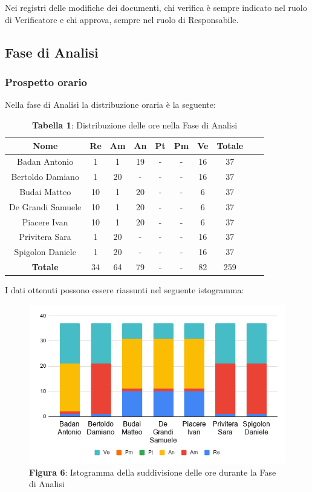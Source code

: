 Nei registri delle modifiche dei documenti, chi verifica è sempre indicato nel ruolo di Verificatore e chi approva, sempre nel ruolo di Responsabile. 


\subsection{Fase di Analisi}
\subsubsection{Prospetto orario}
Nella fase di Analisi la distribuzione oraria è la seguente:
\begin{table}[H]
	\centering
	\renewcommand{\arraystretch}{1.5}
	\begin{tabular}{|c|c|c|c|c|c|c|c|c|c|}
		\hline
		\rowcolor{lighter-grayer}
Nome & Re & Am & An & Pt & Pm & Ve & Totale \\ \hline
Badan Antonio & 1 & 1 & 19 & - & - & 16 & 37 \\ \hline
Bertoldo Damiano & 1 & 20 & - & - & - & 16 & 37 \\ \hline
Budai Matteo & 10 & 1 & 20 & - & - & 6 & 37 \\ \hline
De Grandi Samuele & 10 & 1 & 20 & - & - & 6 & 37 \\ \hline
Piacere Ivan & 10 & 1 & 20 & - & - & 6 & 37 \\ \hline
Privitera Sara & 1 & 20 & - & - & - & 16 & 37 \\ \hline
Spigolon Daniele & 1 & 20 & - & - & - & 16 & 37 \\ \hline
\textbf{Totale} & 34 & 64 & 79 & - & - & 82 & 259 \\ \hline
		
\end{tabular}
\caption*{\textbf{Tabella 1}: Distribuzione delle ore nella Fase di Analisi\\}
\end{table}	

I dati ottenuti possono essere riassunti nel seguente istogramma:
\begin{figure}[H]
	\centering
	\includegraphics[width=0.7\linewidth]{res/images/IstogrammaFase1.png}
	\caption*{\textbf{Figura 6}: Istogramma della suddivisione delle ore durante la Fase di Analisi}
	\label{fig:Figura2}
\end{figure}

